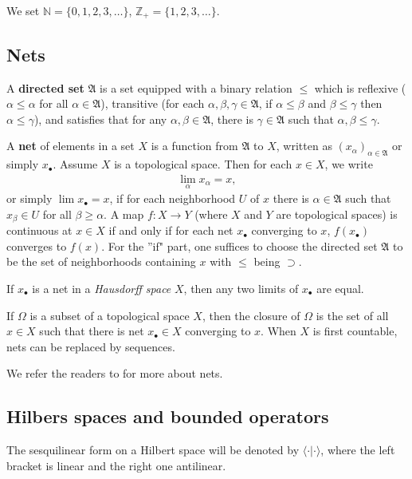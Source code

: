\documentclass[12pt,b5paper,notitlepage]{article}
\theoremstyle{definition}
\theoremstyle{plain}
\newcommand{\fk}{\mathfrak}
\newcommand{\mc}{\mathcal}
\newcommand{\ovl}{\overline}
\newcommand{\bk}[1]{\langle {#1}\rangle}
\newcommand{\blt}{\bullet}
\newcommand{\Cbb}{\mathbb C}
\newcommand{\Nbb}{\mathbb N}
\newcommand{\Zbb}{\mathbb Z}
\numberwithin{equation}{section}
\begin{document}
We set $\Nbb=\{0,1,2,3,\dots\}$, $\Zbb_+=\{1,2,3,\dots\}$. 


\subsection*{Nets}

A \textbf{directed set} $\fk A$ is a set equipped with a binary relation $\leq$ which is reflexive ($\alpha\leq \alpha$ for all $\alpha\in\fk A$), transitive (for each $\alpha,\beta,\gamma\in\fk A$, if $\alpha\leq \beta$ and $\beta\leq\gamma$ then $\alpha\leq\gamma$), and satisfies that for any $\alpha,\beta\in\fk A$, there is $\gamma\in\fk A$ such that $\alpha,\beta\leq\gamma$.

A \textbf{net} of elements in a set $X$ is a function from $\fk A$ to $X$, written as $(x_\alpha)_{\alpha\in\fk A}$ or simply $x_\blt$. Assume $X$ is a topological space. Then for each $x\in X$, we write
\begin{align}
\lim_\alpha x_\alpha=x,	
\end{align}
or simply $\lim x_\blt=x$, if for each neighborhood $U$ of $x$ there is $\alpha\in\fk A$ such that $x_\beta\in U$ for all $\beta\geq \alpha$. A map $f:X\rightarrow Y$ (where $X$ and $Y$ are topological spaces) is continuous at $x\in X$ if and only if for each net $x_\blt$ converging to $x$, $f(x_\blt)$ converges to $f(x)$. For the ''if" part, one suffices to choose the directed set $\fk A$ to be the set of neighborhoods containing $x$ with $\leq$ being $\supset$.

If $x_\blt$ is a net in a \textit{Hausdorff space} $X$, then any two limits of $x_\blt$ are equal.

If $\Omega$ is a subset of a topological space $X$, then the closure of $\Omega$ is the set of all $x\in X$ such that there is net $x_\blt\in X$ converging to $x$. When $X$ is first countable, nets can be replaced by sequences.

We refer the readers to \cite[Chapter 3]{Mun} for more  about nets.

\subsection*{Hilbers spaces and bounded operators}

The sesquilinear form on a Hilbert space will be denoted by $\bk{\cdot|\cdot}$, where the left bracket is linear and the right one antilinear. 
\end{document}
